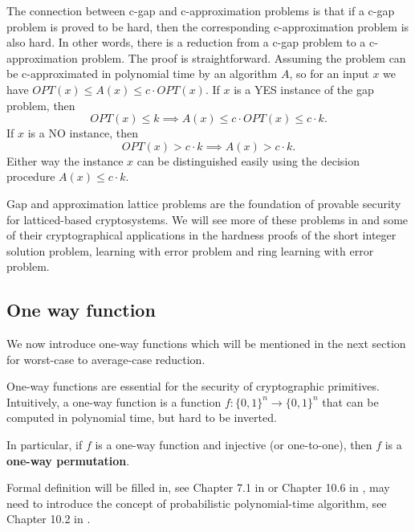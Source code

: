 \documentclass[../main.tex]{subfiles}
\begin{document}
The connection between c-gap and c-approximation problems is that if a c-gap problem is proved to be hard, then the corresponding c-approximation problem is also hard. 
\reversemarginpar
{}
In other words, there is a reduction from a c-gap problem to a c-approximation problem. The proof is straightforward. 
Assuming the problem can be c-approximated in polynomial time by an algorithm $A$, so for an input $x$ we have $OPT(x) \le A(x) \le c\cdot OPT(x)$.
If $x$ is a YES instance of the gap problem, then 
\begin{equation*}
    OPT(x) \le k \implies A(x) \le c \cdot OPT(x) \le c\cdot k.
\end{equation*}
If $x$ is a NO instance, then 
\begin{equation*}
    OPT(x) > c \cdot k \implies A(x) > c \cdot k.
\end{equation*}
Either way the instance $x$ can be distinguished easily using the decision procedure $A(x) \leq c\cdot k$. %

Gap and approximation lattice problems are the foundation of provable security for latticed-based cryptosystems. We will see more of these problems in  and some of their cryptographical applications in the hardness proofs of the short integer solution problem, learning with error problem and ring learning with error problem. 

\iffalse
\subsection{One way function}

We now introduce one-way functions which will be mentioned in the next section for worst-case to average-case reduction. 

One-way functions are essential for the security of cryptographic primitives. Intuitively, a one-way function is a function $f: \{0,1\}^n \rightarrow \{0,1\}^n$ that can be computed in polynomial time, but hard to be inverted.

In particular, if $f$ is a one-way function and injective (or one-to-one), then $f$ is a \textbf{one-way permutation}.

Formal definition will be filled in, see Chapter 7.1 in \citep{katz2014introduction} or Chapter 10.6 in \citep{sipser1996introduction}, may need to introduce the concept of probabilistic polynomial-time algorithm, see Chapter 10.2 in \citep{sipser1996introduction}.
\end{document}
